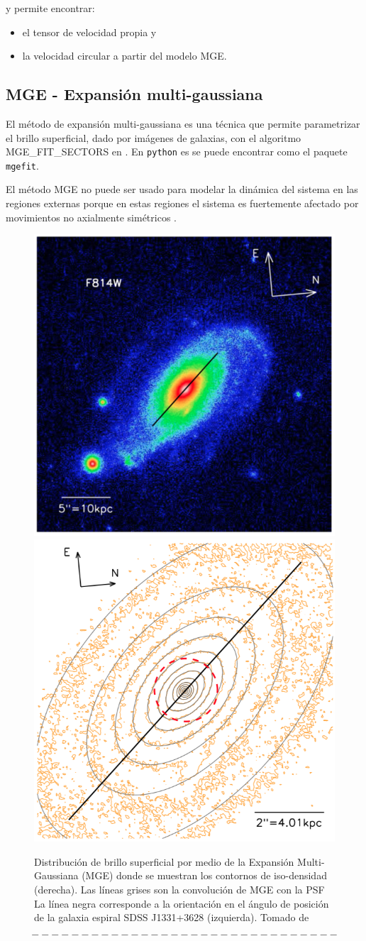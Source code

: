 y permite encontrar:

\begin{itemize}
\item el tensor de velocidad propia y
\item la velocidad circular a partir del modelo MGE.
\end{itemize}


\subsection{MGE - Expansión multi-gaussiana}
El método de expansión multi-gaussiana es una técnica que permite parametrizar el brillo superficial, dado por imágenes de galaxias, con el algoritmo \textsc{MGE\_FIT\_SECTORS} en \cite{C02}. En \verb+python+ es se puede encontrar como el paquete \verb+mgefit+.

El método MGE no puede ser usado para modelar la dinámica del sistema en las regiones externas porque en estas regiones el sistema es fuertemente afectado por movimientos no axialmente simétricos \cite{TR16}.

\begin{figure}
  \centering
  \includegraphics[width=0.45\columnwidth]{Kap2/J1331.png}
  \includegraphics[width=0.45\columnwidth]{Kap2/MGE_1.png}
  \caption{Distribución de brillo superficial  por medio de la Expansión Multi-Gaussiana (MGE) donde se muestran los contornos de iso-densidad (derecha). Las líneas grises son la convolución de MGE con la PSF La línea negra corresponde a la orientación en el ángulo de posición de la galaxia espiral SDSS J1331+3628 (izquierda). Tomado de \cite{TR16}  }
  \label{fig:Fi4}
\end{figure}



\begin{equation}
-------------------------------
\end{equation}










